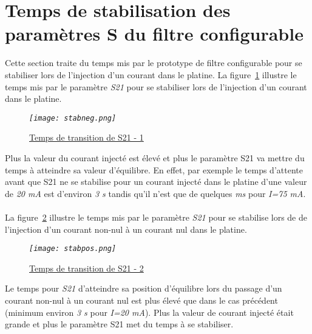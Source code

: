 \documentclass[12pt,fleqn]{book} %
\begin{document}
\section{Temps de stabilisation des paramètres S du filtre configurable}
Cette section traite du temps mis par le prototype de filtre configurable pour se stabiliser lors de l'injection d'un courant dans le platine.
\noindent La figure~\underline{\color{blue}\ref{stabneg}} illustre le temps mis par le paramètre \emph{S21} pour se stabiliser lors de l'injection d'un courant dans le platine.
\begin{figure}[H]
	\centering
	\itshape
	\texttt{[image: stabneg.png]}
	\caption{\label{stabneg} \underline{Temps de transition de S21 - 1}}
\end{figure}
\noindent Plus la valeur du courant injecté est élevé et plus le paramètre S21 va mettre du temps à atteindre sa valeur d'équilibre. En effet, par exemple le temps d'attente avant que S21 ne se stabilise pour un courant injecté dans le platine d'une valeur de \emph{20 mA} est d'environ \emph{3 s} tandis qu'il n'est que de quelques \emph{ms} pour \emph{I=75 mA}.
~\\\noindent La figure~\underline{\color{blue}\ref{stabpos}} illustre le temps mis par le paramètre \emph{S21} pour se stabilise lors de de l'injection d'un courant non-nul à un courant nul dans le platine.
\begin{figure}[H]
	\centering
	\itshape
	\texttt{[image: stabpos.png]}
	\caption{\label{stabpos} \underline{Temps de transition de S21 - 2}}
\end{figure}
\noindent Le temps pour \emph{S21} d'atteindre sa position d'équilibre lors du passage d'un courant non-nul à un courant nul est plus élevé que dans le cas précédent (minimum environ \emph{3 s} pour \emph{I=20 mA}). Plus la valeur de courant injecté était grande et plus le paramètre S21 met du temps à se stabiliser.
\end{document}
